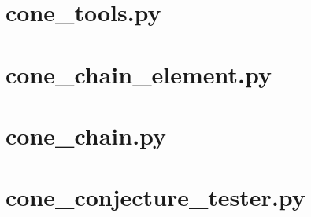 \documentclass{TC}
\begin{document}
\newpage
\section{cone\_tools.py}

\newpage
\section{cone\_chain\_element.py}

\newpage
\section{cone\_chain.py}

\newpage
\section{cone\_conjecture\_tester.py}

\end{document}
